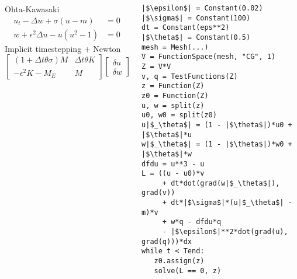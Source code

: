 \documentclass[presentation]{beamer}
\begin{document}
\begin{frame}[fragile]
  \begin{columns}
    \begin{column}{0.5\textwidth}
      \begin{block}{Ohta-Kawasaki}
        \small
        \begin{align*}
          u_t - \Delta w + \sigma(u - m) &= 0\\
          w + \epsilon^2 \Delta u - u(u^2 - 1) &= 0
        \end{align*}
        Implicit timestepping + Newton
        \begin{equation*}
          \begin{bmatrix}
            (1 + \Delta t \theta \sigma)M  & \Delta t\theta K \\
            -\epsilon^2 K - M_E & M
          \end{bmatrix}
          \begin{bmatrix}
            \delta u \\
            \delta w
          \end{bmatrix} =
          \begin{bmatrix}
            f_1 \\
            f_2
          \end{bmatrix}
        \end{equation*}
      \end{block}
    \end{column}
    \begin{column}{0.5\textwidth}
\begin{verbatim}
|$\epsilon$| = Constant(0.02)
|$\sigma$| = Constant(100)
dt = Constant(eps**2)
|$\theta$| = Constant(0.5)
mesh = Mesh(...)
V = FunctionSpace(mesh, "CG", 1)
Z = V*V
v, q = TestFunctions(Z)
z = Function(Z)
z0 = Function(Z)
u, w = split(z)
u0, w0 = split(z0)
u|$_\theta$| = (1 - |$\theta$|)*u0 + |$\theta$|*u
w|$_\theta$| = (1 - |$\theta$|)*w0 + |$\theta$|*w
dfdu = u**3 - u
L = ((u - u0)*v
     + dt*dot(grad(w|$_\theta$|), grad(v))
     + dt*|$\sigma$|*(u|$_\theta$| - m)*v
     + w*q - dfdu*q
     - |$\epsilon$|**2*dot(grad(u), grad(q)))*dx
while t < Tend:
   z0.assign(z)
   solve(L == 0, z)
\end{verbatim}
    \end{column}
  \end{columns}
\end{frame}
\end{document}
